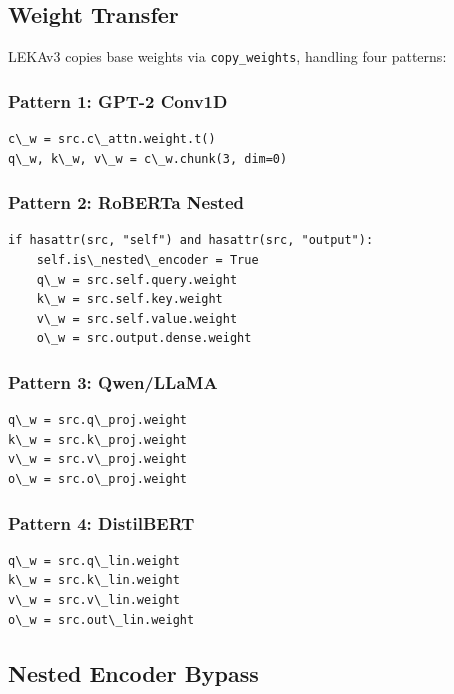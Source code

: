 \subsection{Weight Transfer}

LEKAv3 copies base weights via \texttt{copy\_weights}, handling four patterns:

\subsubsection{Pattern 1: GPT-2 Conv1D}

\begin{lstlisting}
c\_w = src.c\_attn.weight.t()
q\_w, k\_w, v\_w = c\_w.chunk(3, dim=0)
\end{lstlisting}

\subsubsection{Pattern 2: RoBERTa Nested}

\begin{lstlisting}
if hasattr(src, "self") and hasattr(src, "output"):
    self.is\_nested\_encoder = True
    q\_w = src.self.query.weight
    k\_w = src.self.key.weight
    v\_w = src.self.value.weight
    o\_w = src.output.dense.weight
\end{lstlisting}

\subsubsection{Pattern 3: Qwen/LLaMA}

\begin{lstlisting}
q\_w = src.q\_proj.weight
k\_w = src.k\_proj.weight
v\_w = src.v\_proj.weight
o\_w = src.o\_proj.weight
\end{lstlisting}

\subsubsection{Pattern 4: DistilBERT}

\begin{lstlisting}
q\_w = src.q\_lin.weight
k\_w = src.k\_lin.weight
v\_w = src.v\_lin.weight
o\_w = src.out\_lin.weight
\end{lstlisting}

\subsection{Nested Encoder Bypass}

